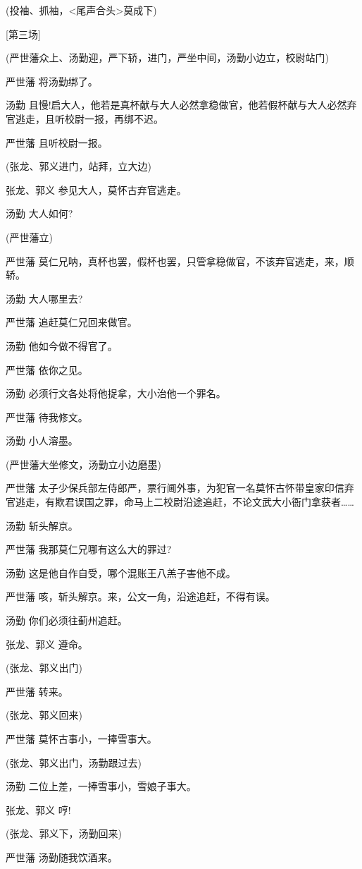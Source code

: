 (投袖、抓袖，\textless{}尾声合头\textgreater{}莫成下)

{[}第三场{]}

(严世藩众上、汤勤迎，严下轿，进门，严坐中间，汤勤小边立，校尉站门)

严世藩 将汤勤绑了。

汤勤
且慢!启大人，他若是真杯献与大人必然拿稳做官，他若假杯献与大人必然弃官逃走，且听校尉一报，再绑不迟。

严世藩 且听校尉一报。

(张龙、郭义进门，站拜，立大边)

张龙、郭义 参见大人，莫怀古弃官逃走。

汤勤 大人如何?

(严世藩立)

严世藩
莫仁兄呐，真杯也罢，假杯也罢，只管拿稳做官，不该弃官逃走，来，顺轿。

汤勤 大人哪里去?

严世藩 追赶莫仁兄回来做官。

汤勤 他如今做不得官了。

严世藩 依你之见。

汤勤 必须行文各处将他捉拿，大小治他一个罪名。

严世藩 待我修文。

汤勤 小人溶墨。

(严世藩大坐修文，汤勤立小边磨墨)

严世藩
太子少保兵部左侍郎严，票行阃外事，为犯官一名莫怀古怀带皇家印信弃官逃走，有欺君误国之罪，命马上二校尉沿途追赶，不论文武大小衙门拿获者\ldots{}\ldots{}

汤勤 斩头解京。

严世藩 我那莫仁兄哪有这么大的罪过?

汤勤 这是他自作自受，哪个混账王八羔子害他不成。

严世藩 咳，斩头解京。来，公文一角，沿途追赶，不得有误。

汤勤 你们必须往蓟州追赶。

张龙、郭义 遵命。

(张龙、郭义出门)

严世藩 转来。

(张龙、郭义回来)

严世藩 莫怀古事小，一捧雪事大。

(张龙、郭义出门，汤勤跟过去)

汤勤 二位上差，一捧雪事小，雪娘子事大。

张龙、郭义 哼!

(张龙、郭义下，汤勤回来)

严世藩 汤勤随我饮酒来。


